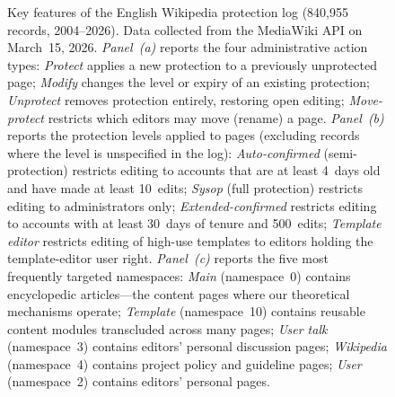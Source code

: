\documentclass[11pt]{article}
\begin{document}
\begin{figure}[!p]
\begin{minipage}[t]{0.48\textwidth}
\centering
{}
\end{minipage}

\caption{Key features of the English Wikipedia protection log (840,955 records, 2004--2026). Data collected from the MediaWiki API on March~15, 2026. \textit{Panel~(a)} reports the four administrative action types: \emph{Protect} applies a new protection to a previously unprotected page; \emph{Modify} changes the level or expiry of an existing protection; \emph{Unprotect} removes protection entirely, restoring open editing; \emph{Move-protect} restricts which editors may move (rename) a page. \textit{Panel~(b)} reports the protection levels applied to pages (excluding records where the level is unspecified in the log): \emph{Auto-confirmed} (semi-protection) restricts editing to accounts that are at least 4~days old and have made at least 10~edits; \emph{Sysop} (full protection) restricts editing to administrators only; \emph{Extended-confirmed} restricts editing to accounts with at least 30~days of tenure and 500~edits; \emph{Template editor} restricts editing of high-use templates to editors holding the template-editor user right. \textit{Panel~(c)} reports the five most frequently targeted namespaces: \emph{Main} (namespace~0) contains encyclopedic articles---the content pages where our theoretical mechanisms operate; \emph{Template} (namespace~10) contains reusable content modules transcluded across many pages; \emph{User talk} (namespace~3) contains editors' personal discussion pages; \emph{Wikipedia} (namespace~4) contains project policy and guideline pages; \emph{User} (namespace~2) contains editors' personal pages.}
\label{fig:eda}
\end{figure}
\end{document}
